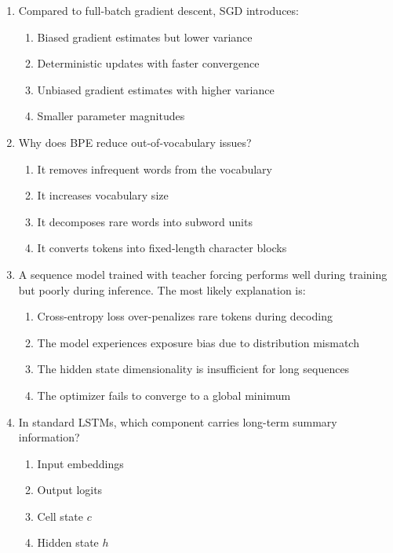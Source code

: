 \documentclass[12pt]{article}
\begin{document}
\begin{enumerate}[label=Q\arabic*.]
 \item Compared to full-batch gradient descent, SGD introduces:
 \begin{enumerate}[label=(\Alph*)]
     \item Biased gradient estimates but lower variance
     \item Deterministic updates with faster convergence
     \item Unbiased gradient estimates with higher variance
     \item Smaller parameter magnitudes
 \end{enumerate}
 
 \item Why does BPE reduce out-of-vocabulary issues?
 \begin{enumerate}[label=(\Alph*)]
     \item It removes infrequent words from the vocabulary
     \item It increases vocabulary size
     \item It decomposes rare words into subword units
     \item It converts tokens into fixed-length character blocks
 \end{enumerate}
 
 \item A sequence model trained with teacher forcing performs well during training but poorly during inference. The most likely explanation is:
 \begin{enumerate}[label=(\Alph*)]
     \item Cross-entropy loss over-penalizes rare tokens during decoding
     \item The model experiences exposure bias due to distribution mismatch
     \item The hidden state dimensionality is insufficient for long sequences
     \item The optimizer fails to converge to a global minimum
 \end{enumerate}
 
 \item In standard LSTMs, which component carries long-term summary information?
 \begin{enumerate}[label=(\Alph*)]
     \item Input embeddings
     \item Output logits
     \item Cell state $c$
     \item Hidden state $h$
 \end{enumerate}
 

\end{enumerate}
\end{document}
